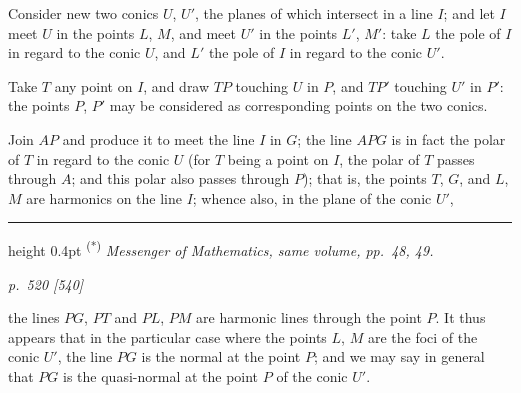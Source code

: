 \documentclass[11pt,a4paper]{article}
\theoremstyle{plain}
\theoremstyle{definition}
\begin{document}
Consider new two conics $U$, $U'$, the planes of which intersect in a line $I$; and let $I$ meet $U$ in the points $L$, $M$, and meet $U'$ in the points $L'$, $M'$: take $L$ the pole of $I$ in regard to the conic $U$, and $L'$ the pole of $I$ in regard to the conic $U'$.

Take $T$ any point on $I$, and draw $TP$ touching $U$ in $P$, and $TP'$ touching $U'$ in $P'$: the points $P$, $P'$ may be considered as corresponding points on the two conics.

Join $AP$ and produce it to meet the line $I$ in $G$; the line $APG$ is in fact the polar of $T$ in regard to the conic $U$ (for $T$ being a point on $I$, the polar of $T$ passes through $A$; and this polar also passes through $P$); that is, the points $T$, $G$, and $L$, $M$ are harmonics on the line $I$; whence also, in the plane of the conic $U'$,

\smallskip
\hrule height 0.4pt
\smallskip
\textsuperscript{(*)} \textit{Messenger of Mathematics, same volume, pp.~48, 49.}

\clearpage

\bigskip
\textit{p.~520 [540]}
\smallskip

the lines $PG$, $PT$ and $PL$, $PM$ are harmonic lines through the point $P$. It thus appears that in the particular case where the points $L$, $M$ are the foci of the conic $U'$, the line $PG$ is the normal at the point $P$; and we may say in general that $PG$ is the quasi-normal at the point $P$ of the conic $U'$.

\begin{center}
\end{center}
\end{document}
